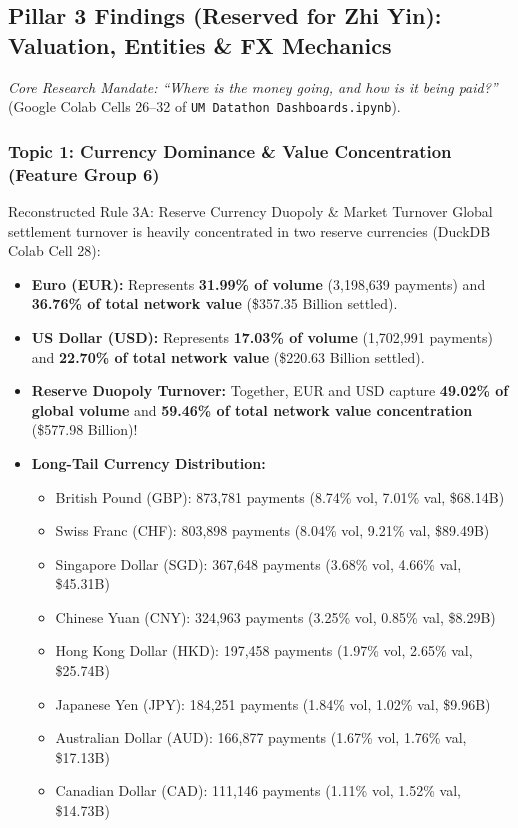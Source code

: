 \documentclass[11pt,a4paper]{article}
\begin{document}
\subsection{Pillar 3 Findings (Reserved for Zhi Yin): Valuation, Entities \& FX Mechanics}
\textit{Core Research Mandate: ``Where is the money going, and how is it being paid?''} (Google Colab Cells 26--32 of \texttt{UM Datathon Dashboards.ipynb}).

\subsubsection{Topic 1: Currency Dominance \& Value Concentration (Feature Group 6)}
\begin{rulebox}{Reconstructed Rule 3A: Reserve Currency Duopoly \& Market Turnover}
Global settlement turnover is heavily concentrated in two reserve currencies (DuckDB Colab Cell 28):
\begin{itemize}
    \item \textbf{Euro (EUR):} Represents \textbf{31.99\% of volume} (3,198,639 payments) and \textbf{36.76\% of total network value} (\$357.35 Billion settled).
    \item \textbf{US Dollar (USD):} Represents \textbf{17.03\% of volume} (1,702,991 payments) and \textbf{22.70\% of total network value} (\$220.63 Billion settled).
    \item \textbf{Reserve Duopoly Turnover:} Together, EUR and USD capture \textbf{49.02\% of global volume} and \textbf{59.46\% of total network value concentration} (\$577.98 Billion)!
    \item \textbf{Long-Tail Currency Distribution:}
    \begin{itemize}
        \item British Pound (GBP): 873,781 payments (8.74\% vol, 7.01\% val, \$68.14B)
        \item Swiss Franc (CHF): 803,898 payments (8.04\% vol, 9.21\% val, \$89.49B)
        \item Singapore Dollar (SGD): 367,648 payments (3.68\% vol, 4.66\% val, \$45.31B)
        \item Chinese Yuan (CNY): 324,963 payments (3.25\% vol, 0.85\% val, \$8.29B)
        \item Hong Kong Dollar (HKD): 197,458 payments (1.97\% vol, 2.65\% val, \$25.74B)
        \item Japanese Yen (JPY): 184,251 payments (1.84\% vol, 1.02\% val, \$9.96B)
        \item Australian Dollar (AUD): 166,877 payments (1.67\% vol, 1.76\% val, \$17.13B)
        \item Canadian Dollar (CAD): 111,146 payments (1.11\% vol, 1.52\% val, \$14.73B)
    \end{itemize}
\end{itemize}
\end{rulebox}
\end{document}
